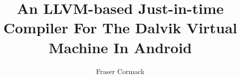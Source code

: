 \documentclass[twoside,abbrevs,bsc,logo,notimes]{./styles/infthesis}
\title{An LLVM-based Just-in-time Compiler For The Dalvik Virtual Machine In Android}
\author{Fraser Cormack}
\begin{document}
    \begin{preliminary}
        \maketitle

        
        \standarddeclaration
        
        \tableofcontents
	    \listoffigures
	\end{preliminary}

	
	
		
	
	
	
	
	

	
	
\end{document}
